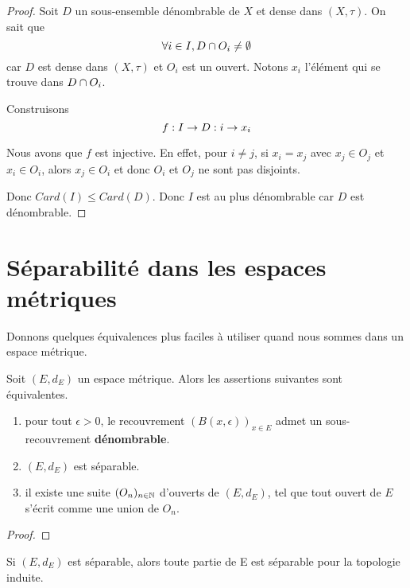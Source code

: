 \ifdefined\outputproof
\begin{proof}
	Soit $D$ un sous-ensemble dénombrable de $X$ et dense dans $(X, \tau)$. On sait que
	\begin{equation}
		\forall i \in I, D \cap O_{i} \neq \emptyset
	\end{equation}
	car $D$ est dense dans $(X, \tau)$ et $O_{i}$ est un ouvert.
	Notons $x_{i}$ l'élément qui se trouve dans $D \cap O_{i}$.

	Construisons
	\begin{equation}
		f : I \rightarrow D : i \rightarrow x_{i}
	\end{equation}

	Nous avons que $f$ est injective.
	En effet, pour $i \neq j$, si $x_{i} = x_{j}$ avec $x_{j} \in O_{j}$ et
	$x_{i} \in O_{i}$, alors $x_{j} \in O_{i}$ et donc $O_{i}$ et $O_{j}$ ne sont pas
	disjoints.

	Donc $Card(I) \leq Card(D)$. Donc $I$ est au plus dénombrable car $D$ est
	dénombrable.
\end{proof}
\fi

\section{Séparabilité dans les espaces métriques}

Donnons quelques équivalences plus faciles à utiliser quand nous sommes dans un
espace métrique.

\begin{proposition}
	Soit $(E, d_{E})$ un espace métrique. Alors les assertions suivantes sont
	équivalentes.
	\begin{enumerate}
		\item pour tout $\epsilon > 0$, le recouvrement $(B(x, \epsilon))_{x \in
			E}$ admet un sous-recouvrement \textbf{dénombrable}.
		\item $(E, d_{E})$ est séparable.
		\item il existe une suite $(O_{n})_{n \in \mathbb{N}}$ d'ouverts de $(E,
			d_{E})$, tel que tout ouvert de $E$ s'écrit comme une union de $O_{n}$.
	\end{enumerate}
\end{proposition}

\ifdefined\outputproof
\begin{proof}

\end{proof}
\fi

\begin{proposition}
	Si $(E, d_{E})$ est séparable, alors toute partie de E est séparable pour la
	topologie induite.
\end{proposition}

